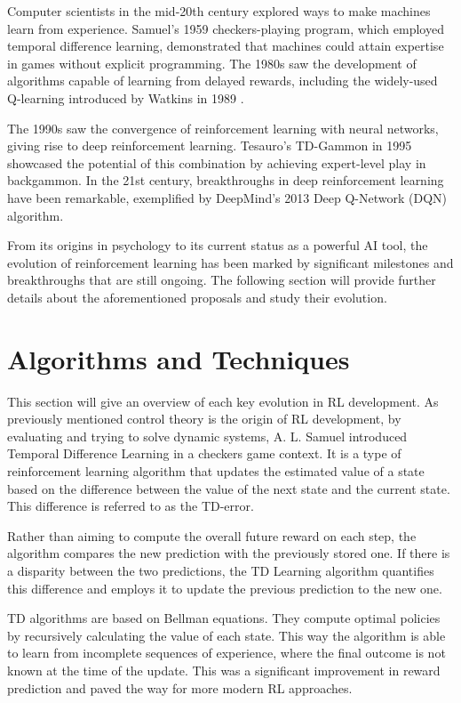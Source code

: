 Computer scientists in the mid-20th century explored ways to make machines learn from experience. Samuel's 1959 checkers-playing program, which employed temporal difference learning\cite{}, demonstrated that machines could attain expertise in games without explicit programming. The 1980s saw the development of algorithms capable of learning from delayed rewards, including the widely-used Q-learning introduced by Watkins in 1989 \cite{}.

The 1990s saw the convergence of reinforcement learning with neural networks, giving rise to deep reinforcement learning. Tesauro's TD-Gammon in 1995 showcased the potential of this combination by achieving expert-level play in backgammon\cite{}. In the 21st century, breakthroughs in deep reinforcement learning have been remarkable, exemplified by DeepMind's 2013 Deep Q-Network (DQN) algorithm\cite{}.

From its origins in psychology to its current status as a powerful AI tool, the evolution of reinforcement learning has been marked by significant milestones and breakthroughs that are still ongoing. The following section will provide further details about the aforementioned proposals and study their evolution.

\section{Algorithms and Techniques}\label{sec:rl-algorithms_and_techniques}
This section will give an overview of each key evolution in RL development. As previously mentioned control theory is the origin of RL development, by evaluating and trying to solve dynamic systems, A. L. Samuel introduced Temporal Difference Learning \cite{samuel1959checkers} in a checkers game context. It is a type of reinforcement learning algorithm that updates the estimated value of a state based on the difference between the value of the next state and the current state. This difference is referred to as the TD-error.

Rather than aiming to compute the overall future reward on each step, the algorithm compares the new prediction with the previously stored one. If there is a disparity between the two predictions, the TD Learning algorithm quantifies this difference and employs it to update the previous prediction to the new one.

TD algorithms are based on Bellman equations. They compute optimal policies by recursively calculating the value of each state. This way the algorithm is able to learn from incomplete sequences of experience, where the final outcome is not known at the time of the update. This was a significant improvement in reward prediction and paved the way for more modern RL approaches. 


